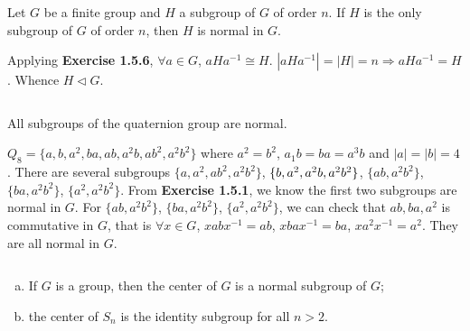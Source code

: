 $$ $$

\begin{ex}
    Let $G$ be a finite group and $H$ a subgroup of $G$ of order $n$. If $H$ is the only subgroup of $G$ of order $n$, then $H$ is normal in $G$.
\end{ex}

\begin{answer}
    Applying \textbf{Exercise 1.5.6}, $\forall a\in G$, $aHa^{-1}\cong H$. $\left| aHa^{-1} \right| =\left| H \right| =n\Rightarrow aHa^{-1}=H$. Whence $H\lhd G$.
\end{answer}

$$ $$

\begin{ex}
    All subgroups of the quaternion group are normal.
\end{ex}

\begin{answer}
    $Q_{8}=\{a,b,a^{2},ba,ab,a^{2}b,ab^{2},a^{2}b^{2}\}$ where $a^{2}=b^{2}$, $a_{1}b=ba=a^{3}b$ and $\left| a \right| =\left| b \right| =4$. There are several subgroups $\{a,a^{2},ab^{2},a^{2}b^{2}\}$, $\{b, a^{2}, a^{2}b,\\ a^{2}b^{2}\}$, $\{ab,a^{2}b^{2}\}$, $\{ba,a^{2}b^{2}\}$, $\{a^{2},a^{2}b^{2}\}$. From \textbf{Exercise 1.5.1}, we know the first two subgroups are normal in $G$. For $\{ab,a^{2}b^{2}\}$, $\{ba,a^{2}b^{2}\}$, $\{a^{2},a^{2}b^{2}\}$, we can check that $ab, ba, a^{2}$ is commutative in $G$, that is $\forall x\in G$, $xabx^{-1}=ab$, $xbax^{-1}=ba$, $xa^{2}x^{-1}=a^{2}$. They are all normal in $G$.
\end{answer}

$$ $$

\begin{ex}
    \begin{enumerate}[(a)]
        \item If $G$ is a group, then the center of $G$ is a normal subgroup of $G$;
        \item the center of $S_{n}$ is the identity subgroup for all $n>2$.
    \end{enumerate}
\end{ex}

